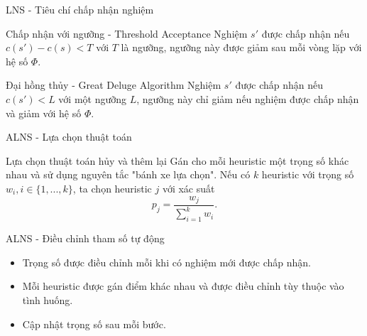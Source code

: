 \begin{frame}{LNS - Tiêu chí chấp nhận nghiệm}
  \begin{block}{Chấp nhận với ngưỡng - Threshold Acceptance}
    Nghiệm $s'$ được chấp nhận nếu $c(s') - c(s) < T$ với $T$ là ngưỡng, ngưỡng này được giảm sau mỗi vòng lặp với hệ số $\Phi$.
  \end{block}
  
  \begin{block}{Đại hồng thủy - Great Deluge Algorithm}
    Nghiệm $s'$ được chấp nhận nếu $c(s') < L$ với một ngưỡng $L$, ngưỡng này chỉ giảm nếu nghiệm được chấp nhận và giảm với hệ số $\Phi$.
  \end{block}
\end{frame}


\begin{frame}{ALNS - Lựa chọn thuật toán}
  \begin{block}{Lựa chọn thuật toán hủy và thêm lại}
    Gán cho mỗi heuristic một trọng số khác nhau và sử dụng nguyên tắc "bánh xe lựa chọn". Nếu có $k$ heuristic với trọng số $w_i, i \in \{1,...,k\}$, ta chọn heuristic $j$ với xác suất
    \begin{equation}
      \label{eq:select}
      p_j = \frac{w_j}{\sum_{i=1}^k w_i}.
    \end{equation}
  \end{block}
\end{frame}

\begin{frame}{ALNS - Điều chỉnh tham số tự động}
  \begin{itemize}
    \item Trọng số được điều chỉnh mỗi khi có nghiệm mới được chấp nhận.
    \item Mỗi heuristic được gán điểm khác nhau và được điều chỉnh tùy thuộc vào tình huống.
    \item Cập nhật trọng số sau mỗi bước.
  \end{itemize}
\end{frame}

